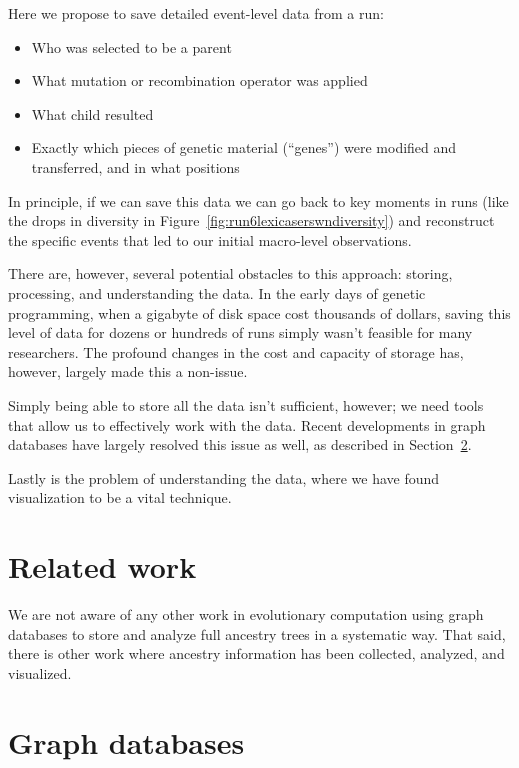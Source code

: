 Here we propose to save detailed event-level data from a run:
\begin{itemize}
	\item Who was selected to be a parent
	\item What mutation or recombination operator was applied
	\item What child resulted
	\item Exactly which pieces of genetic material (``genes'') were
	modified and transferred, and in what positions
\end{itemize}
In principle, if we can save this data we can go back to key moments
in runs (like the drops in diversity in 
Figure~\ref{fig:run6lexicaserswndiversity}) and reconstruct the specific
events that led to our initial macro-level observations.

There are, however, several potential obstacles to this approach: storing, 
processing, and understanding the data. In the early days of genetic programming, when a gigabyte
of disk space cost thousands of dollars, saving this level of data for dozens 
or hundreds of runs simply wasn't feasible for many researchers. The
profound changes in the cost and capacity of storage has, however, 
largely made this a non-issue.

Simply being able to store all the data isn't sufficient, however; we need
tools that allow us to effectively work with the data. Recent developments
in graph databases have largely resolved this issue as well, as described
in Section~\ref{sec:graph_DBs}.

Lastly is the problem of understanding the data, where we have found
visualization to be a vital technique. 


\section{Related work}
\label{sec:related}

We are not aware of any other work in evolutionary computation using graph
databases to store and analyze full ancestry trees in a systematic way. That
said, there is other work where ancestry information has been collected,
analyzed, and visualized.


\section{Graph databases}
\label{sec:graph_DBs}

